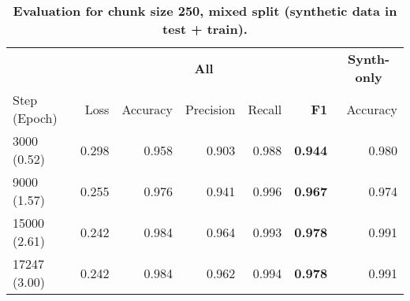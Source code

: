 \begin{table}[H]
\centering
\small
\caption[Evaluation for Chunk Size 250, Mixed Split]{\textbf{Evaluation for chunk size 250, mixed split (synthetic data in test + train).}}
\label{tab:250_mixed}
\begin{tabular}{@{}lrrrr rr@{}}
\toprule
  & \multicolumn{5}{c}{\textbf{All}} 
  & \multicolumn{1}{c}{\textbf{Synth-only}} \\
\cmidrule(lr){2-6} \cmidrule(lr){7-7} 
Step (Epoch) & Loss & Accuracy & Precision & Recall & \textbf{F1} & Accuracy \\
\midrule
3000 (0.52) & 0.298 & 0.958 & 0.903 & 0.988 & \textbf{0.944} & 0.980 \\
9000 (1.57) & 0.255 & 0.976 & 0.941 & 0.996 & \textbf{0.967} & 0.974  \\
15000 (2.61) & 0.242 & 0.984 & 0.964 & 0.993 & \textbf{0.978} & 0.991 \\
17247 (3.00) & 0.242 & 0.984 & 0.962 & 0.994 & \textbf{0.978} & 0.991 \\
\bottomrule
\end{tabular}
\end{table}
